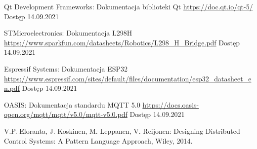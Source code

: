 \documentclass[eng, 11pt, twoside, openany]{mgr}
\begin{document}
  
  
  \begin{thebibliography}{9}

      Qt Development Frameworks: Dokumentacja biblioteki Qt \newline
      \url{https://doc.qt.io/qt-5/} \newline
      Dostęp 14.09.2021

      STMicroelectronics: Dokumentacja L298H \newline
      \url{https://www.sparkfun.com/datasheets/Robotics/L298_H_Bridge.pdf} \newline
      Dostęp 14.09.2021

      Espressif Systems: Dokumentacja ESP32
      \url{https://www.espressif.com/sites/default/files/documentation/esp32_datasheet_en.pdf} \newline
      Dostęp 14.09.2021
      
      OASIS: Dokumentacja standardu MQTT 5.0 \newline
      \url{https://docs.oasis-open.org/mqtt/mqtt/v5.0/mqtt-v5.0.pdf} \newline
      Dostęp 14.09.2021
    
      V.P. Eloranta, J. Koskinen, M. Leppanen, V. Reijonen: 
      Designing Distributed Control Systems: A Pattern Language Approach, 
      Wiley, 2014.
      
  \end{thebibliography}


  \listoffigures
\end{document}
